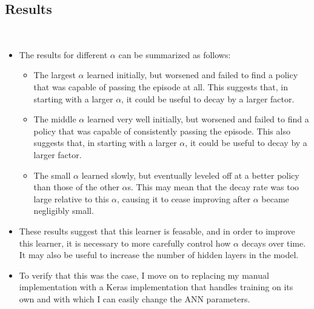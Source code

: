 \documentclass[a4paper]{article}
\begin{document}
\subsection*{Results}
\begin{centering}
    \scalebox{0.6}{} \\
\end{centering}
\begin{itemize}
    \item The results for different $\alpha$ can be summarized as follows:
    \begin{itemize}
        \item The largest $\alpha$ learned initially, but worsened and
            failed to find a policy that was capable of passing the episode at
            all. This suggests that, in starting with a larger $\alpha$, it
            could be useful to decay by a larger factor.
        \item The middle $\alpha$ learned very well initially, but 
            worsened and failed to find a policy that was capable of
            consistently passing the episode.  This also suggests that, in
            starting with a larger $\alpha$, it could be useful to decay by a
            larger factor.
        \item The small $\alpha$ learned slowly, but eventually leveled off at
            a better policy than those of the other $\alpha$s. This may mean
            that the decay rate was too large relative to this $\alpha$, causing
            it to cease improving after $\alpha$ became negligibly small.
    \end{itemize}
    \item These results suggest that this learner is feasable, and in order to
        improve this learner, it is necessary to more carefully control how
        $\alpha$ decays over time. It may also be useful to increase the number
        of hidden layers in the model. 
    \item To verify that this was the case,
        I move on to replacing my manual implementation with a Keras 
        implementation that handles training on its own and with which I can
        easily change the ANN parameters.
\end{itemize}
\end{document}

